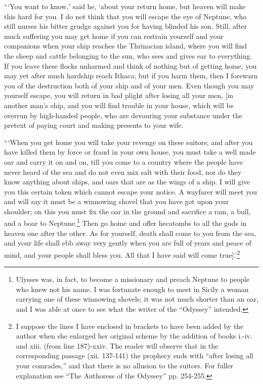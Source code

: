 “‘You want to know,’ said he, ‘about your return home, but heaven will make
this hard for you. I do not think that you will escape the eye of Neptune, who
still nurses his bitter grudge against you for having blinded his son. Still,
after much suffering you may get home if you can restrain yourself and your
companions when your ship reaches the Thrinacian island, where you will find
the sheep and cattle belonging to the sun, who sees and gives ear to
everything. If you leave these flocks unharmed and think of nothing but of
getting home, you may yet after much hardship reach Ithaca; but if you harm
them, then I forewarn you of the destruction both of your ship and of your men.
Even though you may yourself escape, you will return in bad plight after losing
all your men, [in another man’s ship, and you will find trouble in your house,
which will be overrun by high-handed people, who are devouring your substance
under the pretext of paying court and making presents to your wife.

“‘When you get home you will take your revenge on these suitors; and after you
have killed them by force or fraud in your own house, you must take a well made
oar and carry it on and on, till you come to a country where the people have
never heard of the sea and do not even mix salt with their food, nor do they
know anything about ships, and oars that are as the wings of a ship. I will
give you this certain token which cannot escape your notice. A wayfarer will
meet you and will say it must be a winnowing shovel that you have got upon your
shoulder; on this you must fix the oar in the ground and sacrifice a ram, a
bull, and a boar to Neptune.\footnote{Ulysses was, in fact, to become a missionary and preach Neptune to people
who knew not his name. I was fortunate enough to meet in Sicily a woman
carrying one of these winnowing shovels; it was not much shorter than an oar,
and I was able at once to see what the writer of the “Odyssey” intended.} Then go home and offer hecatombs to
all the gods in heaven one after the other. As for yourself, death shall come
to you from the sea, and your life shall ebb away very gently when you are full
of years and peace of mind, and your people shall bless you. All that I have
said will come true].’\footnote{I suppose the lines I have enclosed in brackets to have been added by the
author when she enlarged her original scheme by the addition of books i.-iv.
and xiii. (from line 187)-xxiv. The reader will observe that in the
corresponding passage (xii. 137-141) the prophecy ends with “after losing all
your comrades,” and that there is no allusion to the suitors. For fuller
explanation see “The Authoress of the Odyssey” pp. 254-255.}

